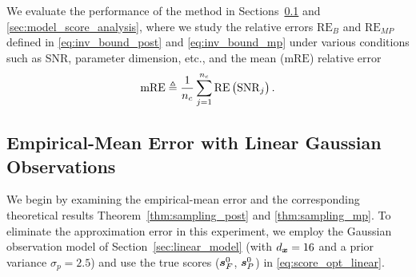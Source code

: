 


We %
evaluate the performance of the \name{} method in Sections~\ref{sec:error_anaylsis_exp} and \ref{sec:model_score_analysis}, where we study the  relative errors %
{$\mathrm{RE}_{B}$ and $\mathrm{RE}_{MP}$ defined in \eqref{eq:inv_bound_post} and \eqref{eq:inv_bound_mp}} under various conditions such as SNR, parameter dimension, etc., and the mean ($\mathrm{mRE}$) relative error %
\begin{equation}\label{eq:mean_re}
    \mathrm{mRE}\triangleq\frac{1}{n_c}\sum_{j=1}^{n_c}\mathrm{RE}\left(\mathrm{SNR}_j\right).
\end{equation}



\subsection{{%
Empirical-Mean Error with Linear Gaussian Observations}}\label{sec:error_anaylsis_exp}
We begin by examining the empirical-mean error %
{and the corresponding theoretical results Theorem~\ref{thm:sampling_post} and \ref{thm:sampling_mp}.}
To eliminate the {approximation error} in this experiment, we employ the Gaussian observation model 
of Section~\ref{sec:linear_model} (with ${d_{\bm{x}}}=16$ and a prior variance $\sigma_p=2.5$) and use the {true}
scores ($\bm{s}_{F}^{0}$, $\bm{s}_{P}^{0}$) in \eqref{eq:score_opt_linear}.  

